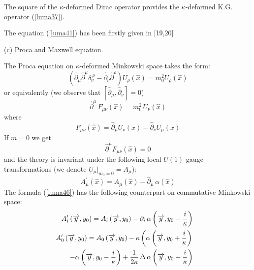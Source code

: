 \documentclass[a4paper,a4paper]{article}
\begin{document}
The square of the $\kappa$-deformed Dirac operator provides the
$\kappa$-deformed K.G. operator (\ref{luma37}).

The equation (\ref{luma41}) has been firstly given in    [19,20]

(c) Proca and Maxwell equation.



The Proca equation on $\kappa$-deformed Minkowski space takes the
form:
\begin{equation}\label{luma42}  %
  \left( \widehat{\partial}_{\mu} \widehat{\partial}^{\mu}
  \delta_{\nu} ^{\ \rho} -
\widehat{\partial}_{\nu}
\widehat{\partial}^{\rho} \right)
  U_{\rho} ( \widehat{x}) = m^{2}_{0} U_{\rho} ( \widehat{x})
\end{equation}
or equivalently (we observe that $\left[ \widehat{\partial}_{\mu},
\widehat{\partial}_{\nu} \right] = 0$)
\begin{equation}\label{luma43}  %
   \widehat{\partial }^{\mu} \, F_{\mu\nu}( \widehat{x}) =
  m^{2}_{0} \, U_{\nu} ( \widehat{x})
\end{equation}
where
\begin{equation}\label{luma44}    %
  F_{\mu\nu}( \widehat{x}) = \widehat{\partial}_{\mu} U_{\nu} (x)
   - \widehat{\partial}_{\nu} U_{\mu} (x)
\end{equation}
If $m=0$ we get
\begin{equation}\label{luma45}  %
  \widehat{\partial}^{\mu} F_{\mu\nu} ( \widehat{x}) = 0
\end{equation}
and the theory is invariant under the following local $U(1)$
gauge transformations (we denote $U_{\mu}\big|_{m_{0}=0} =
A_{\mu}$):
\begin{equation}\label{luma46}  %
  A^{\prime}_{\mu} ( \widehat{x}) = A_{\mu} ( \widehat{x}) -
  \widehat{\partial}_{\mu} \, \alpha ( \widehat{x})
\end{equation}
The formula (\ref{luma46})
 has the following counterpart on commutative
Minkowski space:
\begin{eqnarray}\label{luma47}  %
   A^{\prime}_{i}\left( \overrightarrow{y}, y_{0} \right)
=
  A_{i} \left(\overrightarrow{y},y_{0} \right) -
  \partial_{i} \, \alpha
\left( \overrightarrow{y},
   y_{0} - {i\over \kappa}
     \right) &&
  \cr
 A^{\prime}_{0} \left( \overrightarrow{y}, y_{0} \right)
=
  A_{0}  \left( \overrightarrow{y},y_{0} \right) -
    \kappa \left(
   \alpha
   \left( \overrightarrow{y}, y_{0}
   +
   {i\over  \kappa}
    \right)     \right. &&
\cr
 -
     \alpha \left(
 \overrightarrow{y},
   y_{0} - {i\over \kappa}
    \right)
    +
    {1\over 2 \kappa} \, \Delta \, \alpha
\left(
     \overrightarrow{y}, y_{0} + {i\over \kappa}
\right)
&&
\end{eqnarray}
\end{document}
